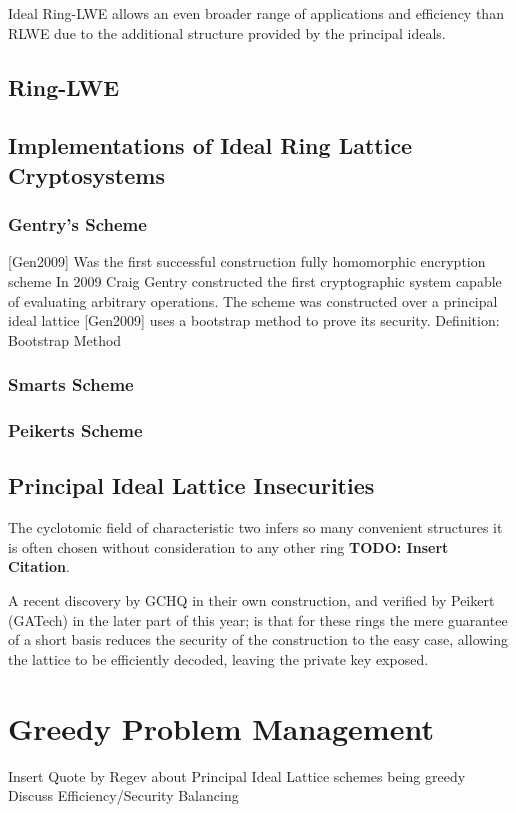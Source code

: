 Ideal Ring-LWE allows an even broader range of applications and efficiency than RLWE due to the additional structure provided by the principal ideals.

\subsection{Ring-LWE}

\subsection{Implementations of Ideal Ring Lattice Cryptosystems}

\subsubsection{Gentry's Scheme}
[Gen2009] Was the first successful construction fully homomorphic encryption scheme In 2009 Craig Gentry constructed the first cryptographic system capable of evaluating arbitrary operations. The scheme was constructed over a principal ideal lattice [Gen2009] uses a bootstrap method to prove its security.
Definition: Bootstrap Method 

\subsubsection{Smarts Scheme}

\subsubsection{Peikerts Scheme}

\subsection{Principal Ideal Lattice Insecurities}

The cyclotomic field of characteristic two infers so many convenient
structures it is often chosen without consideration to any other ring \textbf{TODO: Insert Citation}.

A recent discovery by GCHQ in their own construction, and verified by Peikert
(GATech) in the later part of this year; is that for these rings the
mere guarantee of a short basis reduces the security of the
construction to the easy case, allowing the lattice to be efficiently
decoded, leaving the private key exposed.

\section{Greedy Problem Management}

Insert Quote by Regev about Principal Ideal Lattice schemes being greedy 
Discuss Efficiency/Security Balancing

